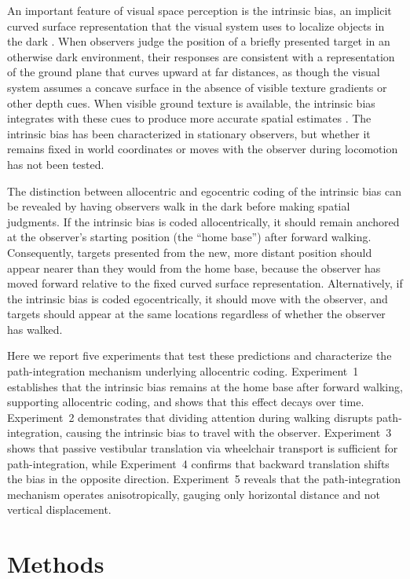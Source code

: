\documentclass[12pt]{article}
\begin{document}
An important feature of visual space perception is the intrinsic bias, an implicit curved surface representation that the visual system uses to localize objects in the dark \citep{ooi2001, wu2004}. When observers judge the position of a briefly presented target in an otherwise dark environment, their responses are consistent with a representation of the ground plane that curves upward at far distances, as though the visual system assumes a concave surface in the absence of visible texture gradients or other depth cues. When visible ground texture is available, the intrinsic bias integrates with these cues to produce more accurate spatial estimates \citep{he2004}. The intrinsic bias has been characterized in stationary observers, but whether it remains fixed in world coordinates or moves with the observer during locomotion has not been tested.

The distinction between allocentric and egocentric coding of the intrinsic bias can be revealed by having observers walk in the dark before making spatial judgments. If the intrinsic bias is coded allocentrically, it should remain anchored at the observer's starting position (the ``home base'') after forward walking. Consequently, targets presented from the new, more distant position should appear nearer than they would from the home base, because the observer has moved forward relative to the fixed curved surface representation. Alternatively, if the intrinsic bias is coded egocentrically, it should move with the observer, and targets should appear at the same locations regardless of whether the observer has walked.

Here we report five experiments that test these predictions and characterize the path-integration mechanism underlying allocentric coding. Experiment~1 establishes that the intrinsic bias remains at the home base after forward walking, supporting allocentric coding, and shows that this effect decays over time. Experiment~2 demonstrates that dividing attention during walking disrupts path-integration, causing the intrinsic bias to travel with the observer. Experiment~3 shows that passive vestibular translation via wheelchair transport is sufficient for path-integration, while Experiment~4 confirms that backward translation shifts the bias in the opposite direction. Experiment~5 reveals that the path-integration mechanism operates anisotropically, gauging only horizontal distance and not vertical displacement.

\section{Methods}
\end{document}
